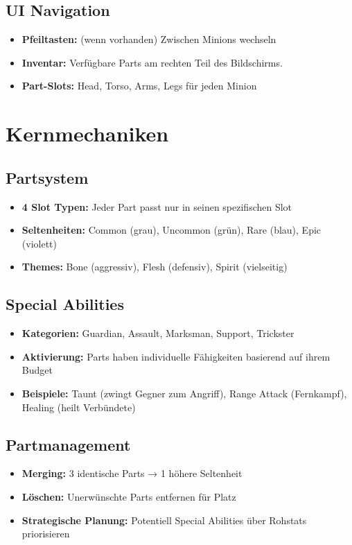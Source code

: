 \documentclass[12pt,a4paper]{article}
\begin{document}
\subsection{UI Navigation}
\begin{itemize}
    \item \textbf{Pfeiltasten:} (wenn vorhanden) Zwischen Minions wechseln
    \item \textbf{Inventar:} Verfügbare Parts am rechten Teil des Bildschirms.
    \item \textbf{Part-Slots:} Head, Torso, Arms, Legs für jeden Minion
\end{itemize}

\section{Kernmechaniken}

\subsection{Partsystem}
\begin{itemize}
    \item \textbf{4 Slot Typen:} Jeder Part passt nur in seinen spezifischen Slot
    \item \textbf{Seltenheiten:} Common (grau), Uncommon (grün), Rare (blau), Epic (violett)
    \item \textbf{Themes:} Bone (aggressiv), Flesh (defensiv), Spirit (vielseitig)
\end{itemize}

\subsection{Special Abilities}
\begin{itemize}
    \item \textbf{Kategorien:} Guardian, Assault, Marksman, Support, Trickster
    \item \textbf{Aktivierung:} Parts haben individuelle Fähigkeiten basierend auf ihrem Budget
    \item \textbf{Beispiele:} Taunt (zwingt Gegner zum Angriff), Range Attack (Fernkampf), Healing (heilt Verbündete)
\end{itemize}

\subsection{Partmanagement}
\begin{itemize}
    \item \textbf{Merging:} 3 identische Parts → 1 höhere Seltenheit
    \item \textbf{Löschen:} Unerwünschte Parts entfernen für Platz
    \item \textbf{Strategische Planung:} Potentiell Special Abilities über Rohstats priorisieren
\end{itemize}
\end{document}
